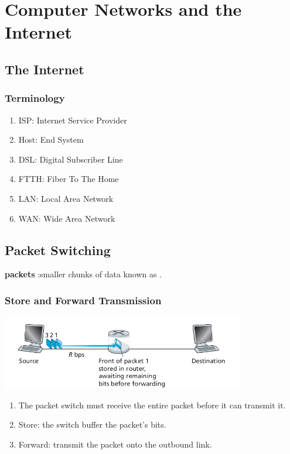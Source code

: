 \chapter{Computer Networks and the Internet}

\section{The Internet}

\subsection{Terminology}

\begin{enumerate}
    \item ISP: Internet Service Provider
    \item Host: End System
    \item DSL: Digital Subscriber Line
    \item FTTH: Fiber To The Home
    \item LAN: Local Area Network
    \item WAN: Wide Area Network
\end{enumerate}


\section{Packet Switching}

\textbf{packets} :smaller chunks of data known as .

\subsection{Store and Forward Transmission}

\begin{center}
    \includegraphics[width=0.8\textwidth]{chapters/chapter1/StoreAndForward.png}
    \label{c1_store&forward}
\end{center}

\begin{enumerate}
    \item The packet switch must receive the entire packet before it can transmit it.
    \item Store: the switch buffer the packet's bits.
    \item Forward: transmit the packet onto the outbound link.
\end{enumerate}


